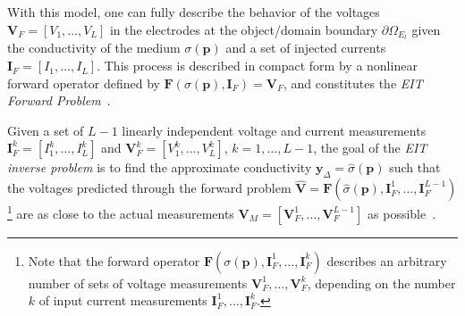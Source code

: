 \documentclass[10pt]{IEEEtran}
\newcommand{\cmag}{\textcolor{magenta}}
\newcommand{\vp}{\mathbf{\textstyle{p}}}
\newcommand{\vy}{\mathbf{y}}
\begin{document}




With this model, one can fully describe the behavior of the voltages ${\mathbf{V}_{\!F}}=[V_{1},\ldots,V_{L}]$ in the electrodes at the object/domain boundary $\partial\Omega_{E_l}$ given the conductivity of the medium $\sigma(\vp)$ and a set of injected currents~$\mathbf{I}_F=[I_1,\ldots,I_L]$.
%
This process is described in compact form by a nonlinear forward operator defined by $\mathbf{F}({\sigma}(\vp),\mathbf{I}_F)={\mathbf{V}_{\!F}}$, and constitutes the \textit{EIT Forward Problem}~\cite{Holder04}.




Given a set of $L-1$ linearly independent voltage and current measurements $\mathbf{I}_F^k=[I_1^k,\ldots,I_L^k]$
and $\mathbf{V}_{\!F}^k=[V_1^k,\ldots,V_L^k]$, $k=1,\ldots,L-1$, the goal of the \textit{EIT inverse problem} is to find the approximate conductivity $\vy_{\Delta}=\hat{\sigma}(\vp)$ such that the voltages predicted through the forward problem $\widehat{\mathbf{{V}}}=\mathbf{F}(\hat{\sigma}(\vp),\mathbf{I}_F^1,\ldots,\mathbf{I}_F^{L-1})$
%
\footnote{Note that the forward operator $\mathbf{F}(\sigma(\vp),\mathbf{I}_F^1,\ldots,\mathbf{I}_F^k)$ describes an arbitrary number of sets of voltage measurements $\mathbf{V}_{\!F}^1,\ldots,\mathbf{V}_{\!F}^k$, depending on the number $k$ of input current measurements $\mathbf{I}_F^1,\ldots,\mathbf{I}_F^k$.}
%
are as close to the actual measurements $\mathbf{V}_M=[\mathbf{V}_{\!F}^1,\ldots,\mathbf{V}_{\!F}^{L-1}]$ as possible~\cite{Holder04}.
\end{document}
